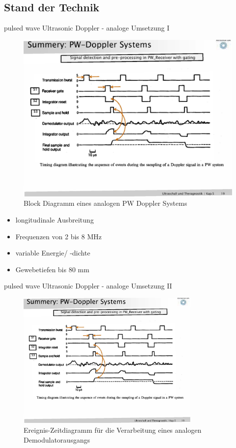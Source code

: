 \documentclass{beamer}
\begin{document}
\subsection{Stand der Technik}
\begin{frame}{pulsed wave Ultrasonic Doppler - analoge Umsetzung I}
\begin{figure}
	\centering
	\includegraphics[page=2,trim = 13mm 60mm 1mm 58mm, clip=true, width=\textwidth]{Ultrasound/pw_rx}
	\caption{Block Diagramm eines analogen PW Doppler Systems}
\label{fig:analog_pwd_bloc}
\end{figure}
\begin{itemize}
			\item[\Checkmark] longitudinale Ausbreitung
			\item[\Checkmark] Frequenzen von 2 bis 8 MHz			
			\item[\Checkmark] variable Energie/ -dichte
			\item[\Checkmark] Gewebetiefen bis 80 mm
		\end{itemize}
\end{frame}
\begin{frame}{pulsed wave Ultrasonic Doppler - analoge Umsetzung II}
\begin{figure}
	\centering
	\includegraphics[page=1,trim = 23mm 48mm 27mm 42mm, clip=true, width=0.8\textwidth]{Ultrasound/pw_rx}
	\caption{Ereignis-Zeitdiagramm für die Verarbeitung eines analogen Demodulatorausgangs}
\label{fig:demodulator}
\end{figure}
\end{frame}
\end{document}
